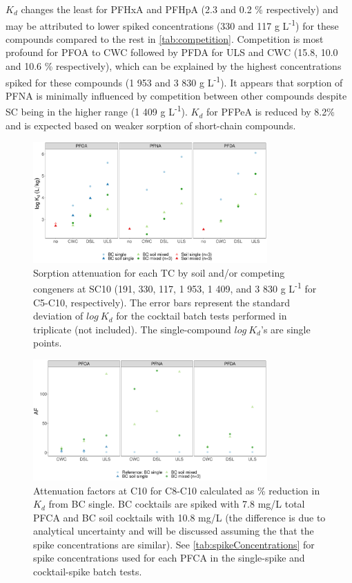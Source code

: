 $K_d$ changes the least for PFHxA and PFHpA (2.3 and 0.2 \% respectively) and may be attributed to lower spiked concentrations (330 and 117 \textmu g L\textsuperscript{-1}) for these compounds compared to the rest in \cref{tab:competition}. Competition is most profound for PFOA to CWC followed by PFDA for ULS and CWC (15.8, 10.0 and 10.6 \% respectively), which can be explained by the highest concentrations spiked for these compounds (1 953 and 3 830 \textmu g L\textsuperscript{-1}). It appears that sorption of PFNA is minimally influenced by competition between other compounds despite SC being in the higher range (1 409 \textmu g L\textsuperscript{-1}). $K_d$ for PFPeA is reduced by 8.2\% and is expected based on weaker sorption of short-chain compounds.

\begin{figure}[htb]
    \centering
    \includegraphics[width=0.8\textwidth]{R/figs/C10.pdf}
    \caption{Sorption attenuation for each TC by soil and/or competing congeners at SC10 (191, 330, 117, 1 953, 1 409, and 3 830 \textmu g L\textsuperscript{-1} for C5-C10, respectively). The error bars represent the standard deviation of $log~K_d$ for the cocktail batch tests performed in triplicate (not included). The single-compound $log~K_d$'s are single points.}
    \label{fig:C10}
\end{figure}
\begin{figure}[htb]
    \centering
    \includegraphics[width=0.8\textwidth]{R/figs/Attenuation_factors_C10_OND.pdf}
    \caption{Attenuation factors at C10 for C8-C10 calculated as \% reduction in $K_d$ from BC single. BC cocktails are spiked with 7.8 mg/L total PFCA and BC soil cocktails with 10.8 mg/L (the difference is due to analytical uncertainty and will be discussed assuming the that the spike concentrations are similar). See \cref{tab:spikeConcentrations} for spike concentrations used for each PFCA in the single-spike and cocktail-spike batch tests.}
    \label{fig:attenuation_factors}
\end{figure}

